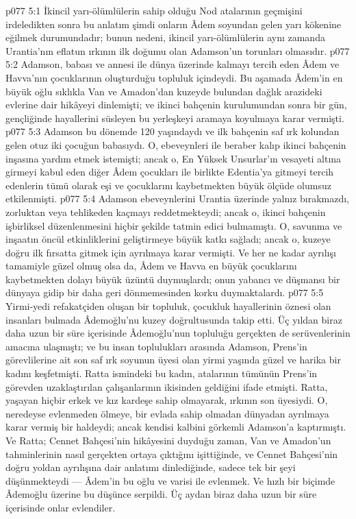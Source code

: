 \vs p077 5:1 İkincil yarı\hyp{}ölümlülerin sahip olduğu Nod atalarının geçmişini irdeledikten sonra bu anlatım şimdi onların Âdem soyundan gelen yarı kökenine eğilmek durumundadır; bunun nedeni, ikincil yarı\hyp{}ölümlülerin aynı zamanda Urantia’nın eflatun ırkının ilk doğumu olan Adamson’un torunları olmasıdır.
\vs p077 5:2 Adamson, babası ve annesi ile dünya üzerinde kalmayı tercih eden Âdem ve Havva’nın çocuklarının oluşturduğu topluluk içindeydi. Bu aşamada Âdem’in en büyük oğlu sıklıkla Van ve Amadon’dan kuzeyde bulundan dağlık arazideki evlerine dair hikâyeyi dinlemişti; ve ikinci bahçenin kurulumundan sonra bir gün, gençliğinde hayallerini süsleyen bu yerleşkeyi aramaya koyulmaya karar vermişti.
\vs p077 5:3 Adamson bu dönemde 120 yaşındaydı ve ilk bahçenin saf ırk kolundan gelen otuz iki çocuğun babasıydı. O, ebeveynleri ile beraber kalıp ikinci bahçenin inşasına yardım etmek istemişti; ancak o, En Yüksek Unsurlar’ın vesayeti altına girmeyi kabul eden diğer Âdem çocukları ile birlikte Edentia’ya gitmeyi tercih edenlerin tümü olarak eşi ve çocuklarını kaybetmekten büyük ölçüde olumsuz etkilenmişti.
\vs p077 5:4 Adamson ebeveynlerini Urantia üzerinde yalnız bırakmazdı, zorluktan veya tehlikeden kaçmayı reddetmekteydi; ancak o, ikinci bahçenin işbirliksel düzenlenmesini hiçbir şekilde tatmin edici bulmamıştı. O, savunma ve inşaatın öncül etkinliklerini geliştirmeye büyük katkı sağladı; ancak o, kuzeye doğru ilk fırsatta gitmek için ayrılmaya karar vermişti. Ve her ne kadar ayrılışı tamamiyle güzel olmuş olsa da, Âdem ve Havva en büyük çocuklarını kaybetmekten dolayı büyük üzüntü duymuşlardı; onun yabancı ve düşmansı bir dünyaya gidip bir daha geri dönmemesinden korku duymaktalardı.
\vs p077 5:5 Yirmi\hyp{}yedi refakatçiden oluşan bir topluluk, çocukluk hayallerinin öznesi olan insanları bulmada Âdemoğlu’nu kuzey doğrultusunda takip etti. Üç yıldan biraz daha uzun bir süre içerisinde Âdemoğlu’nun topluluğu gerçekten de serüvenlerinin amacına ulaşmıştı; ve bu insan toplulukları arasında Adamson, Prens’in görevlilerine ait son saf ırk soyunun üyesi olan yirmi yaşında güzel ve harika bir kadını keşfetmişti. Ratta ismindeki bu kadın, atalarının tümünün Prens’in görevden uzaklaştırılan çalışanlarının ikisinden geldiğini ifade etmişti. Ratta, yaşayan hiçbir erkek ve kız kardeşe sahip olmayarak, ırkının son üyesiydi. O, neredeyse evlenmeden ölmeye, bir evlada sahip olmadan dünyadan ayrılmaya karar vermiş bir haldeydi; ancak kendisi kalbini görkemli Adamson’a kaptırmıştı. Ve Ratta; Cennet Bahçesi'nin hikâyesini duyduğu zaman, Van ve Amadon’un tahminlerinin nasıl gerçekten ortaya çıktığını işittiğinde, ve Cennet Bahçesi’nin doğru yoldan ayrılışına dair anlatımı dinlediğinde, sadece tek bir şeyi düşünmekteydi --- Âdem’in bu oğlu ve varisi ile evlenmek. Ve hızlı bir biçimde Âdemoğlu üzerine bu düşünce serpildi. Üç aydan biraz daha uzun bir süre içerisinde onlar evlendiler.
